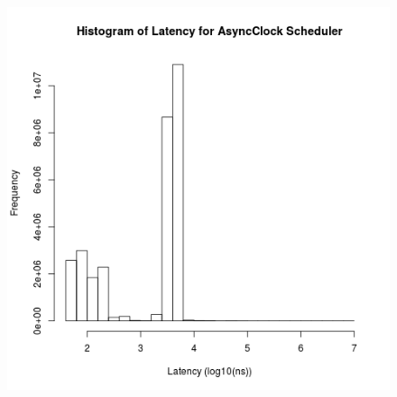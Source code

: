
\begin{figure}
\center
\includegraphics[width=\textwidth]{async_clock_latency_hist.png}
\caption{\label{async_clock_latency}}
\end{figure}

\clearpage


